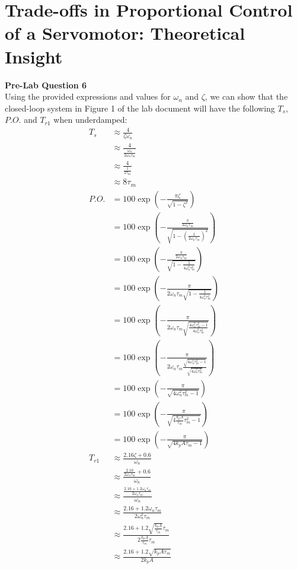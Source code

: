 \documentclass[12pt]{article}
\begin{document}
\section{Trade-offs in Proportional Control of a Servomotor: Theoretical Insight}
\textbf{Pre-Lab Question 6} \\
Using the provided expressions and values for $\omega_n$ and $\zeta$, we can show that the closed-loop system in Figure 1 of the lab document will have the following $T_s$, $P.O.$ and $T_{r1}$ when underdamped:
\begin{align*}
    T_s &\approx \frac{4}{\zeta\omega_n} \\
    &\approx \frac{4}{\frac{\omega_n}{2\omega_n\tau_m}} \\
    &\approx \frac{4}{\frac{1}{2\tau_m}} \\
    &\approx 8\tau_m \\
    P.O. &= 100\exp\left(-\frac{\pi\zeta}{\sqrt{1-\zeta^2}}\right) \\
    &= 100\exp\left(-\frac{\frac{\pi}{2\omega_n\tau_m}}{\sqrt{1-\left(\frac{1}{2\omega_n\tau_m}\right)^2}}\right) \\
    &= 100\exp\left(-\frac{\frac{\pi}{2\omega_n\tau_m}}{\sqrt{1-\frac{1}{4\omega_n^2\tau_m^2}}}\right) \\
    &= 100\exp\left(-\frac{\pi}{2\omega_n\tau_m\sqrt{1-\frac{1}{4\omega_n^2\tau_m^2}}}\right) \\
    &= 100\exp\left(-\frac{\pi}{2\omega_n\tau_m\sqrt{\frac{4\omega_n^2\tau_m^2 - 1}{4\omega_n^2\tau_m^2}}}\right) \\
    &= 100\exp\left(-\frac{\pi}{2\omega_n\tau_m\frac{\sqrt{4\omega_n^2\tau_m^2 - 1}}{\sqrt{4\omega_n^2\tau_m^2}}}\right) \\
    &= 100\exp\left(-\frac{\pi}{\sqrt{4\omega_n^2\tau_m^2 - 1}}\right) \\
    &= 100\exp\left(-\frac{\pi}{\sqrt{4\frac{k_pA}{\tau_m}\tau_m^2 - 1}}\right) \\
    &= 100\exp\left(-\frac{\pi}{\sqrt{4k_pA\tau_m - 1}}\right) \\
    T_{r1} &\approx \frac{2.16\zeta + 0.6}{\omega_n} \\
    &\approx \frac{\frac{2.16}{2\omega_n\tau_m} + 0.6}{\omega_n} \\
    &\approx \frac{\frac{2.16 + 1.2\omega_n\tau_m}{2\omega_n\tau_m}}{\omega_n} \\
    &\approx \frac{2.16 + 1.2\omega_n\tau_m}{2\omega_n^2\tau_m} \\
    &\approx \frac{2.16 + 1.2\sqrt{\frac{k_pA}{\tau_m}}\tau_m}{2\frac{k_pA}{\tau_m}\tau_m} \\
    &\approx \frac{2.16 + 1.2\sqrt{k_pA\tau_m}}{2k_pA} \\
\end{align*}
\end{document}
